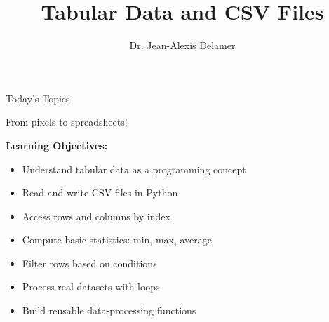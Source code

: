\documentclass{csbeamer}
\title{Tabular Data and CSV Files}
\author{Dr. Jean-Alexis Delamer}
\begin{document}
\begin{frame}
\titlepage
\end{frame}

\begin{frame}{Today's Topics}
    \begin{center}
        \Large From pixels to spreadsheets!
    \end{center}

    \vspace{1em}

    \textbf{Learning Objectives:}
    \begin{itemize}
        \item<1-> Understand \textcolor{stfxblue}{tabular data} as a programming concept
        \item<2-> Read and write \textcolor{marigold}{CSV files} in Python
        \item<3-> Access rows and columns by \textcolor{stfxblue}{index}
        \item<4-> Compute basic statistics: \textcolor{marigold}{min}, \textcolor{marigold}{max}, \textcolor{marigold}{average}
        \item<5-> Filter rows based on \textcolor{stfxblue}{conditions}
        \item<6-> Process real datasets with \textcolor{marigold}{loops}
        \item<7-> Build reusable \textcolor{stfxblue}{data-processing functions}
    \end{itemize}

    \vspace{1em}

    \begin{center}
    \end{center}
\end{frame}
\end{document}

